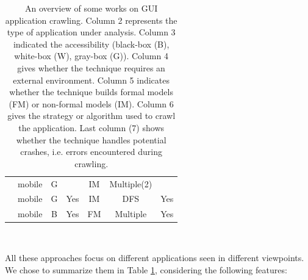 \begin{table}
\begin{tabular}{| c | c | c | c | c | c | c |}
		\cite{WPX13}                            &mobile                 &G  &  &IM &Multiple(2)		& 	\\

		\cite{Azim13}                           &mobile                 &G	&Yes &IM &DFS		& Yes \\

		\cite{SP15}								&mobile                 &B	&Yes &FM &Multiple		& Yes \\
		\hline
	\end{tabular}
	\\

	\caption{An overview of some works on GUI application
	crawling. Column 2 represents the type of application under
	analysis. Column 3 indicated the accessibility (black-box
	(B), white-box (W), gray-box (G)). Column 4 gives whether the
	technique requires an external environment. Column 5
	indicates whether the technique builds formal models (FM) or
	non-formal models (IM). Column 6 gives the strategy or
	algorithm used to crawl the application. Last column (7)
	shows whether the technique handles potential crashes, i.e.
	errors encountered during crawling.}
	\label{table:gui_works}
\end{table}

All these approaches focus on different applications seen in
different viewpoints. We chose to summarize them in Table
\ref{table:gui_works}, considering the following features:

